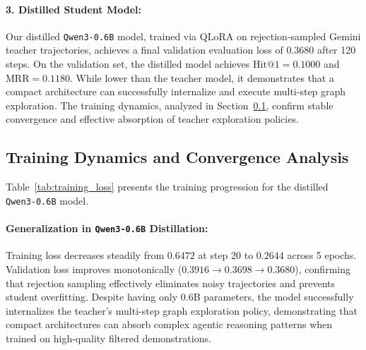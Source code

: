 \documentclass[11pt]{article}
\begin{document}
\paragraph{3. Distilled Student Model:}
Our distilled \texttt{Qwen3-0.6B} model, trained via QLoRA on rejection-sampled Gemini teacher trajectories, achieves a final validation evaluation loss of $\mathbf{0.3680}$ after 120 steps. On the validation set, the distilled model achieves $\text{Hit@1} = 0.1000$ and $\text{MRR} = 0.1180$. While lower than the teacher model, it demonstrates that a compact architecture can successfully internalize and execute multi-step graph exploration. The training dynamics, analyzed in Section~\ref{sec:training_dynamics}, confirm stable convergence and effective absorption of teacher exploration policies.

\begin{table}[t]
\centering
\small
{}
\caption{Training and validation loss progression during distillation of \texttt{Qwen3-0.6B}.}
\label{tab:training_loss}
\end{table}

\subsection{Training Dynamics and Convergence Analysis}
\label{sec:training_dynamics}
Table~\ref{tab:training_loss} presents the training progression for the distilled \texttt{Qwen3-0.6B} model.

\paragraph{Generalization in \texttt{Qwen3-0.6B} Distillation:}
Training loss decreases steadily from $0.6472$ at step 20 to $0.2644$ across 5 epochs. Validation loss improves monotonically ($0.3916 \to 0.3698 \to \mathbf{0.3680}$), confirming that rejection sampling effectively eliminates noisy trajectories and prevents student overfitting. Despite having only 0.6B parameters, the model successfully internalizes the teacher's multi-step graph exploration policy, demonstrating that compact architectures can absorb complex agentic reasoning patterns when trained on high-quality filtered demonstrations.
\end{document}
